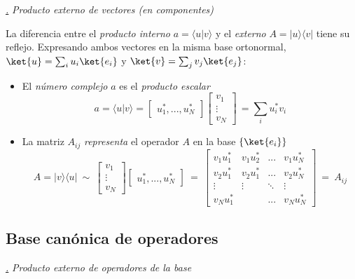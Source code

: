 \documentclass[a4paper,11pt]{book} %
\numberwithin{equation}{chapter}
\newcommand{\braket}[2]{\langle #1|#2\rangle}
\newcommand{\ketbra}[2]{| #1\rangle \! \langle #2|}
\def\subsubiContadorIt{\par\addtocounter{subsubsection}{1}\underline{\it\thesubsubsection.}\hskip0.5cm \setcounter{subsubsubsectionIt}{0}}
\newcommand{\SubsubiIt}[1]{
		\subsubiContadorIt \textit{#1}
	}
\newcounter{subsubsubsectionIt}[subsubsection]
\begin{document}
			\SubsubiIt{Producto externo de vectores (en componentes)}
			
La diferencia entre el \textit{producto interno} $a=\braket{u}{v}$ y el \textit{externo} $A=\ketbra{u}{v}$ tiene su reflejo. Expresando ambos vectores en la misma base ortonormal, $\ket{u} = \sum_i u_i\ket{e_i}$ y $\ket{v} = \sum_j v_j \ket{e_j}$:
\begin{itemize}
	\item El \textit{número complejo} $a$  es el \textit{producto escalar}
	\begin{equation}
 a = \braket{u}{v}  = \begin{bmatrix} u_1^*,...,u_N^*\end{bmatrix}
\begin{bmatrix} v_1 \\ \vdots \\ v_N\end{bmatrix}\, =  \sum_i u_i^*v_i
	\end{equation}

	\item La matriz $A_{ij}$ \textit{representa} el operador $A$ en la base $\{\ket{e_i}\}$
	\begin{equation}
\boxed{A = \ketbra{v}{u} ~\sim ~\begin{bmatrix} v_1 \\ \vdots \\ v_N\end{bmatrix}
\begin{bmatrix} u_1^*,...,u_N^*\end{bmatrix} ~=~ 
\begin{bmatrix} v_1 u_1^* & v_1u_2^* & ... & v_1 u_N^* \\
v_2 u_1^* & v_2 u_1^*& ... & v_2 u_N^* \\ \vdots & \vdots  & \ddots & \vdots \\
v_N u_1^* & & ... & v_N u_N^* \end{bmatrix} ~ = ~A_{ij}}
	\end{equation}

\end{itemize}


		\subsection{Base canónica de operadores}

			\SubsubiIt{Producto externo de operadores de la base}
			
\end{document}
